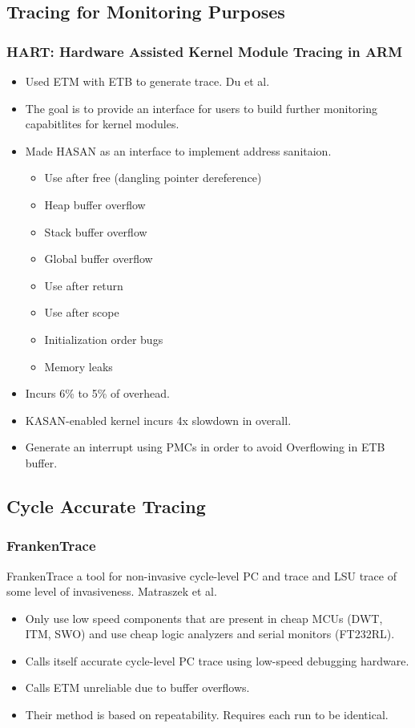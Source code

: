 \documentclass{beamer}
\begin{document}
\subsection{Tracing for Monitoring Purposes}
\begin{frame}
    \frametitle{HART: Hardware Assisted Kernel Module Tracing in ARM}
    \begin{itemize}
        \item Used ETM with ETB to generate trace. Du et al.\cite{du2020hart}
        \item The goal is to provide an interface for users to build further
            monitoring capabitlites for kernel modules.
        \item Made HASAN as an interface to implement address sanitaion.
            \begin{itemize}
                \item Use after free (dangling pointer dereference)
                \item Heap buffer overflow
                \item Stack buffer overflow
                \item Global buffer overflow
                \item Use after return
                \item Use after scope
                \item Initialization order bugs
                \item Memory leaks
            \end{itemize}
        \item Incurs 6\% to 5\% of overhead.
        \item KASAN-enabled kernel incurs 4x slowdown in overall.
        \item Generate an interrupt using PMCs in order to avoid Overflowing in
            ETB buffer.
    \end{itemize}
\end{frame}

\subsection{Cycle Accurate Tracing}
\begin{frame}
    \frametitle{FrankenTrace}
    FrankenTrace a tool for non-invasive cycle-level PC and
    trace and LSU trace of some level of invasiveness. Matraszek et al.\cite{matraszek2023frankentrace}
    \begin{itemize}
        \item Only use low speed components that are present in cheap
            MCUs (DWT, ITM, SWO) and use cheap logic
            analyzers and serial monitors (FT232RL).
        \item Calls itself accurate cycle-level PC trace using
            low-speed debugging hardware.
        \item Calls ETM unreliable due to buffer overflows.
        \item Their method is based on repeatability.
            Requires each run to be identical.
    \end{itemize}
\end{frame}
\end{document}

